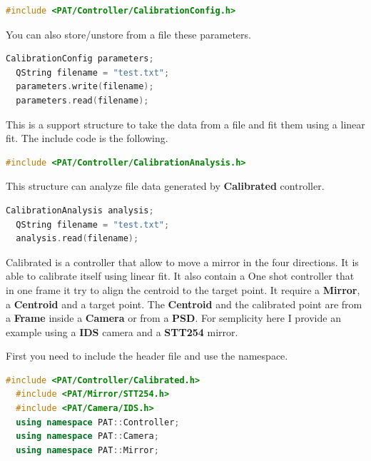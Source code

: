 \begin{lstlisting}[language=c++, gobble=2]
  #include <PAT/Controller/CalibrationConfig.h>
\end{lstlisting}


You can also store/unstore from a file these parameters.

\begin{lstlisting}[language=c++, gobble=2]
  CalibrationConfig parameters;
  QString filename = "test.txt";
  parameters.write(filename);
  parameters.read(filename);
\end{lstlisting}



This is a support structure to take the data from a file and fit them
using a linear fit. The include code is the following.

\begin{lstlisting}[language=c++, gobble=2]
  #include <PAT/Controller/CalibrationAnalysis.h>
\end{lstlisting}

This structure can analyze file data generated by \textbf{Calibrated}
controller.

\begin{lstlisting}[language=c++, gobble=2]
  CalibrationAnalysis analysis;
  QString filename = "test.txt";
  analysis.read(filename);
\end{lstlisting}


Calibrated is a controller that allow to move a mirror in the four
directions. It is able to calibrate itself using linear fit. It also
contain a One shot controller that in one frame it try to align the
centroid to the target point. It require a \textbf{Mirror}, a
\textbf{Centroid} and a target point. The \textbf{Centroid} and the
calibrated point are from a \textbf{Frame} inside a \textbf{Camera} or
from a \textbf{PSD}. For semplicity here I provide an example using a
\textbf{IDS} camera and a \textbf{STT254} mirror.

First you need to include the header file and use the namespace.

\begin{lstlisting}[language=c++, gobble=2]
  #include <PAT/Controller/Calibrated.h>
  #include <PAT/Mirror/STT254.h>
  #include <PAT/Camera/IDS.h>
  using namespace PAT::Controller;
  using namespace PAT::Camera;
  using namespace PAT::Mirror;
\end{lstlisting}

